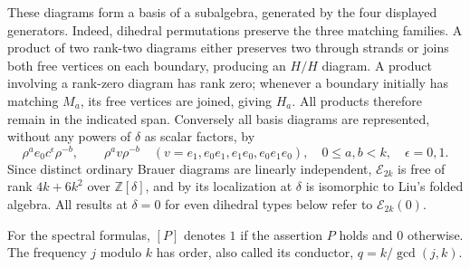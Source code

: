 \documentclass[11pt,a4paper]{amsart}
\theoremstyle{uprightdefinition}
\theoremstyle{remark}\newtheorem{remark}[theorem]{Remark}
\begin{document}
These diagrams form a basis of a subalgebra, generated by the four displayed
generators.  Indeed, dihedral permutations preserve the three matching
families.  A product of two rank-two diagrams either preserves two through
strands or joins both free vertices on each boundary, producing an $H/H$
diagram.  A product involving a rank-zero diagram has rank zero; whenever
a boundary initially has matching $M_a$, its free vertices are joined,
giving $H_a$.  All products therefore remain in the indicated span.
Conversely all basis diagrams are represented, without any powers of
$\delta$ as scalar factors, by
\[
 \rho^a e_0c^\epsilon\rho^{-b},\qquad
 \rho^a v\rho^{-b}\quad
 (v=e_1,e_0e_1,e_1e_0,e_0e_1e_0),
 \quad 0\le a,b<k,\quad\epsilon=0,1.
\]
Since distinct ordinary Brauer diagrams are linearly independent,
$\mathcal E_{2k}$ is free of rank $4k+6k^2$ over $\mathbb Z[\delta]$, and by \cite[Theorem~1.6]{LiuI22014} its localization at $\delta$ is isomorphic to Liu's folded algebra. All results at $\delta=0$ for even dihedral types below refer
to $\mathcal E_{2k}(0)$.

For the spectral formulas, $[P]$ denotes $1$ if the assertion $P$ holds
and $0$ otherwise. The frequency $j$ modulo $k$ has order, also called
its conductor, $q=k/\gcd(j,k)$.
\end{document}
